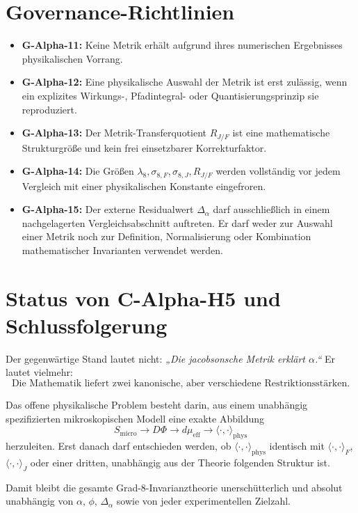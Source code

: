 \documentclass[11pt,a4paper]{article}
\begin{document}
\section{Governance-Richtlinien}

\begin{itemize}
    \item \textbf{G-Alpha-11:} Keine Metrik erhält aufgrund ihres numerischen Ergebnisses physikalischen Vorrang.
    \item \textbf{G-Alpha-12:} Eine physikalische Auswahl der Metrik ist erst zulässig, wenn ein explizites Wirkungs-, Pfadintegral- oder Quantisierungsprinzip sie reproduziert.
    \item \textbf{G-Alpha-13:} Der Metrik-Transferquotient $R_{J/F}$ ist eine mathematische Strukturgröße und kein frei einsetzbarer Korrekturfaktor.
    \item \textbf{G-Alpha-14:} Die Größen $\lambda_8, \sigma_{8,F}, \sigma_{8,J}, R_{J/F}$ werden vollständig vor jedem Vergleich mit einer physikalischen Konstante eingefroren.
    \item \textbf{G-Alpha-15:} Der externe Residualwert $\Delta_\alpha$ darf ausschließlich in einem nachgelagerten Vergleichsabschnitt auftreten. Er darf weder zur Auswahl einer Metrik noch zur Definition, Normalisierung oder Kombination mathematischer Invarianten verwendet werden.
\end{itemize}

\section{Status von C-Alpha-H5 und Schlussfolgerung}

Der gegenwärtige Stand lautet nicht: \textit{„Die jacobsonsche Metrik erklärt $\alpha$.“} 
Er lautet vielmehr:
$$\boxed{ \text{Die Mathematik liefert zwei kanonische, aber verschiedene Restriktionsstärken.} }$$

Das offene physikalische Problem besteht darin, aus einem unabhängig spezifizierten mikroskopischen Modell eine exakte Abbildung
$$\boxed{ S_{\mathrm{micro}} \longrightarrow D\Phi \longrightarrow d\mu_{\mathrm{eff}} \longrightarrow \langle \cdot, \cdot \rangle_{\mathrm{phys}} }$$
herzuleiten. Erst danach darf entschieden werden, ob $\langle \cdot, \cdot \rangle_{\mathrm{phys}}$ identisch mit $\langle \cdot, \cdot \rangle_F$, $\langle \cdot, \cdot \rangle_J$ oder einer dritten, unabhängig aus der Theorie folgenden Struktur ist. 

Damit bleibt die gesamte Grad-8-Invarianztheorie unerschütterlich und absolut unabhängig von $\alpha$, $\phi$, $\Delta_\alpha$ sowie von jeder experimentellen Zielzahl.
\end{document}
